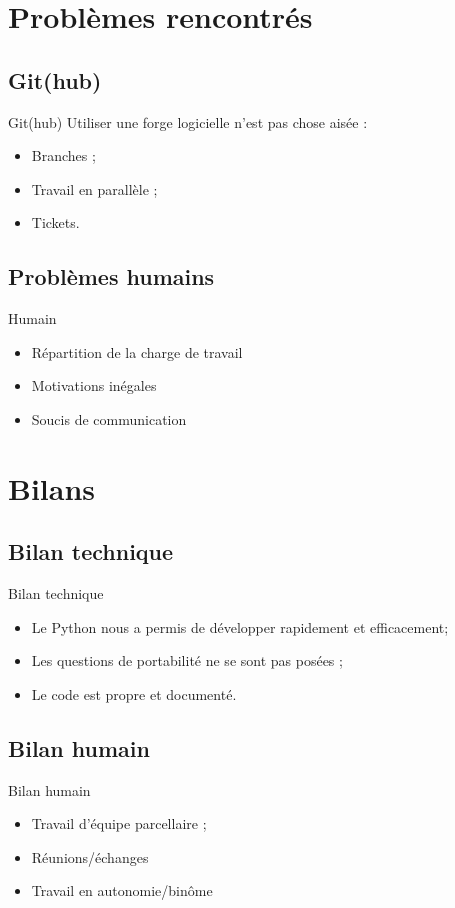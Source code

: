 \documentclass{beamer}
\begin{document}
\section{Problèmes rencontrés}
\subsection{Git(hub)}
	\begin{frame}{Git(hub)}
	    Utiliser une forge logicielle n'est pas chose aisée :
		\begin{itemize}
		\setlength{\itemsep}{0.5cm}
			\item Branches ;
			\item Travail en parallèle ;
			\item Tickets.
		\end{itemize}
	\end{frame}
\subsection{Problèmes humains}
	\begin{frame}{Humain}
	    \begin{itemize}
		\setlength{\itemsep}{1cm}
	        \item Répartition de la charge de travail
	        \item Motivations inégales
	        \item Soucis de communication
        \end{itemize}
	\end{frame}


\section{Bilans}
\subsection{Bilan technique}
	\begin{frame}{Bilan technique}
		\begin{itemize}
		\setlength{\itemsep}{0.3cm}
			\item Le Python nous a permis de développer rapidement et efficacement;
			\item Les questions de portabilité ne se sont pas posées ;
			\item Le code est propre et documenté.
		\end{itemize}
	\end{frame}
\subsection{Bilan humain}
	\begin{frame}{Bilan humain}
		\begin{itemize}
			\item Travail d'équipe parcellaire ;
			\item Réunions/échanges
			\vspace{1cm}
			\item Travail en autonomie/binôme
		\end{itemize}
	\end{frame}
\end{document}

